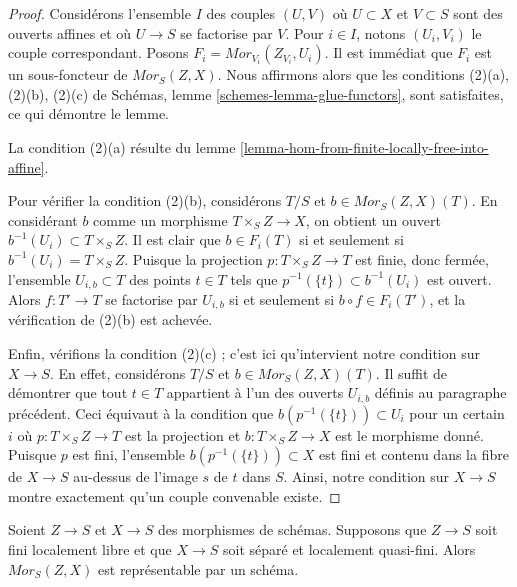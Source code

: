 \begin{proof}
Considérons l'ensemble $I$ des couples $(U, V)$ où $U \subset X$ et $V \subset S$
sont des ouverts affines et où $U \to S$ se factorise par $V$. Pour $i \in I$, notons
$(U_i, V_i)$ le couple correspondant. Posons
$F_i = \mathit{Mor}_{V_i}(Z_{V_i}, U_i)$.
Il est immédiat que $F_i$ est un sous-foncteur de $\mathit{Mor}_S(Z, X)$.
Nous affirmons alors que les conditions
(2)(a), (2)(b), (2)(c) de
Schémas, lemme \ref{schemes-lemma-glue-functors}, sont satisfaites, ce qui démontre le lemme.

\medskip\noindent
La condition (2)(a) résulte du
lemme \ref{lemma-hom-from-finite-locally-free-into-affine}.

\medskip\noindent
Pour vérifier la condition (2)(b), considérons $T/S$ et $b \in \mathit{Mor}_S(Z, X)(T)$.
En considérant $b$ comme un morphisme $T \times_S Z \to X$, on obtient un ouvert
$b^{-1}(U_i) \subset T \times_S Z$. Il est clair que $b \in F_i(T)$
si et seulement si $b^{-1}(U_i) = T \times_S Z$. Puisque la projection
$p : T \times_S Z \to T$ est finie, donc fermée, l'ensemble
$U_{i, b} \subset T$ des points $t \in T$ tels que
$p^{-1}(\{t\}) \subset b^{-1}(U_i)$ est ouvert.
Alors $f : T' \to T$ se factorise par $U_{i, b}$ si et seulement
si $b \circ f \in F_i(T')$, et la vérification de (2)(b) est achevée.

\medskip\noindent
Enfin, vérifions la condition (2)(c) ; c'est ici qu'intervient notre condition
sur $X \to S$. En effet, considérons
$T/S$ et $b \in \mathit{Mor}_S(Z, X)(T)$.
Il suffit de démontrer que tout $t \in T$
appartient à l'un des ouverts $U_{i, b}$ définis
au paragraphe précédent.
Ceci équivaut à la condition que
$b(p^{-1}(\{t\})) \subset U_i$ pour un certain $i$
où $p : T \times_S Z \to T$ est la projection et
$b : T \times_S Z \to X$ est le morphisme donné.
Puisque $p$ est fini, l'ensemble $b(p^{-1}(\{t\})) \subset X$
est fini et contenu dans la fibre de $X \to S$ au-dessus de
l'image $s$ de $t$ dans $S$.
Ainsi, notre condition sur $X \to S$ montre exactement qu'un
couple convenable existe.
\end{proof}

\begin{lemma}
\label{lemma-hom-from-finite-locally-free-separated-lqf}
Soient $Z \to S$ et $X \to S$ des morphismes de schémas.
Supposons que $Z \to S$ soit fini localement libre et que $X \to S$
soit séparé et localement quasi-fini.
Alors $\mathit{Mor}_S(Z, X)$ est représentable par un schéma.
\end{lemma}

